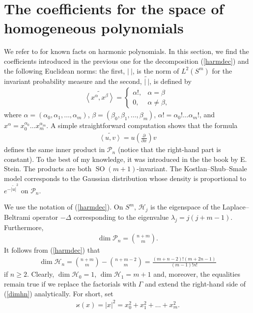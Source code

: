 \documentclass[10pt]{amsart}
\theoremstyle{remark}
\let\wtd=\widetilde
\begin{document}
\section{The coefficients for the space of homogeneous polynomials}
\label{seccoepn} We refer to \cite[Chapter~5]{Ax01} for known
facts on harmonic polynomials. In this section, we find the
coefficients introduced in the previous one for the decomposition
(\ref{harmdec}) and the following Euclidean norms: the first, $|\
|$, is the norm of $L^2(S^m)$ for the invariant probability
measure and the second, $\wtd{|\ |}$, is defined by
\begin{eqnarray}\label{decph}
\wtd{{\left<{x^{{\mathord{\alpha}}}},{x^{{\mathord{\beta}}}}\right>}}=\begin{cases}{{\mathord{\alpha}}}!,&{{\mathord{\alpha}}}={{\mathord{\beta}}}
\\0,&{{\mathord{\alpha}}}\neq{{\mathord{\beta}}},
\end{cases}
\end{eqnarray}
where ${{\mathord{\alpha}}}=({{\mathord{\alpha}}}_0,{{\mathord{\alpha}}}_1,\dots,{{\mathord{\alpha}}}_m)$,
${{\mathord{\beta}}}=({{\mathord{\beta}}}_0,{{\mathord{\beta}}}_1,\dots,{{\mathord{\beta}}}_m)$, ${{\mathord{\alpha}}}!={{\mathord{\alpha}}}_0!\dots{{\mathord{\alpha}}}_m!$, and
$x^{{\mathord{\alpha}}}=x_0^{{{\mathord{\alpha}}}_0}\dots x_m^{{{\mathord{\alpha}}}_m}$.
A simple straightforward computation shows that the formula
\begin{eqnarray}\label{sympro}
\wtd{{\left<{u},{v}\right>}}=u\left(\frac{\partial}{\partial x}\right)v
\end{eqnarray}
defines the same inner product in ${\mathcal{P}}_n$ (notice that the
right-hand part is constant). To the best of my knowledge, it was
introduced in the the book \cite{St70} by E.\,Stein. The products
are both ${\mathop{\mathrm{SO}}}(m+1)$-invariant. The Kostlan--Shub--Smale model
corresponds to the Gaussian distribution whose density is
proportional to $e^{-\wtd{|u|}^2}$ on ${\mathcal{P}}_n$.

We use the notation of (\ref{harmdec}). On $S^m$, ${\mathcal{H}}_j$ is the
eigenspace of the Laplace--Beltrami operator $-{{\mathord{\Delta}}}$ corresponding
to the eigenvalue ${{\mathord{\lambda}}}_j=j(j+m-1)$. Furthermore,
\begin{eqnarray}\label{dimcpn}
\dim{\mathcal{P}}_n={{n+m}\choose{m}}.
\end{eqnarray}
It follows from (\ref{harmdec}) that
\begin{eqnarray}\label{dimhn}
\dim{\mathcal{H}}_n={{n+m}\choose{m}}-{{n+m-2}\choose{m}}
=\frac{(m+n-2)!(m+2n-1)}{(m-1)!n!}
\end{eqnarray}
if $n\geq2$. Clearly, $\dim{\mathcal{H}}_0=1$, $\dim{\mathcal{H}}_1=m+1$ and,
moreover, the equalities remain true if we replace the factorials
with ${{\mathord{\Gamma}}}$ and extend the right-hand side of (\ref{dimhn})
analytically. For short, set
\begin{eqnarray*}
{{\mathord{\varkappa}}}(x)=|x|^2=x_0^2+x_1^2+\dots+x_m^2.
\end{eqnarray*}
\end{document}
